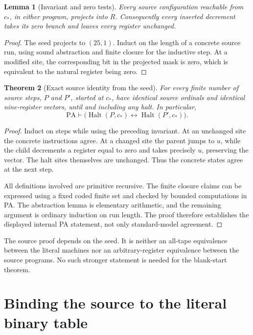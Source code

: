 \documentclass[11pt,letterpaper]{article}
\newcommand{\PA}{\mathrm{PA}}
\newcommand{\Halt}{\operatorname{Halt}}
\newtheorem{theorem}{Theorem}[section]
\newtheorem{lemma}[theorem]{Lemma}
\begin{document}
\begin{lemma}[Invariant and zero tests]
Every source configuration reachable from \(c_*\), in either program,
projects into \(R\). Consequently every inserted decrement takes its
zero branch and leaves every register unchanged.
\end{lemma}
\begin{proof}
The seed projects to \((25,1)\). Induct on the length of a concrete
source run, using sound abstraction and finite closure for the inductive
step. At a modified site, the corresponding bit in the projected mask
is zero, which is equivalent to the natural register being zero.
\end{proof}

\begin{theorem}[Exact source identity from the seed]
For every finite number of source steps, \(P\) and \(P'\), started at
\(c_*\), have identical source ordinals and identical nine-register
vectors, until and including any halt. In particular,
\[
 \PA\vdash\bigl(\Halt(P,c_*)\leftrightarrow\Halt(P',c_*)\bigr).
\]
\end{theorem}
\begin{proof}
Induct on steps while using the preceding invariant. At an unchanged
site the concrete instructions agree. At a changed site the parent
jumps to \(u\), while the child decrements a register equal to zero and
takes precisely \(u\), preserving the vector. The halt sites themselves
are unchanged. Thus the concrete states agree at the next step.

All definitions involved are primitive recursive. The finite closure
claims can be expressed using a fixed coded finite set and checked by
bounded computations in PA. The abstraction lemma is elementary
arithmetic, and the remaining argument is ordinary induction on run
length. The proof therefore establishes the displayed internal PA
statement, not only standard-model agreement.
\end{proof}

The source proof depends on the seed. It is neither an all-tape
equivalence between the literal machines nor an arbitrary-register
equivalence between the source programs. No such stronger statement is
needed for the blank-start theorem.

\section{Binding the source to the literal binary table}
\label{sec:physical}
\end{document}
